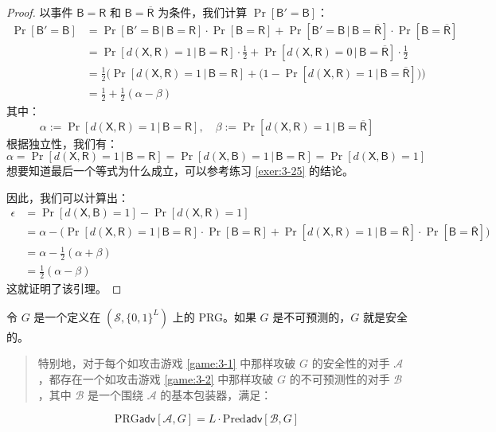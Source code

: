 \begin{proof}
以事件 $\mathsf{B}=\mathsf{R}$ 和 $\mathsf{B}=\mathsf{\overline R}$ 为条件，我们计算 $\Pr[\mathsf{B}'=\mathsf{B}]$：
\[
\begin{aligned}
\Pr[\mathsf{B}'=\mathsf{B}]
&=\Pr[\mathsf{B}'=\mathsf{B}\,|\,\mathsf{B}=\mathsf{R}]\cdot\Pr[\mathsf{B}=\mathsf{R}]+\Pr[\mathsf{B}'=\mathsf{B}\,|\,\mathsf{B}=\mathsf{\overline R}]\cdot\Pr[\mathsf{B}=\mathsf{\overline R}]\\
&=\Pr[d(\mathsf{X},\mathsf{R})=1\,|\,\mathsf{B}=\mathsf{R}]\cdot\frac{1}{2}+\Pr[d(\mathsf{X},\mathsf{R})=0\,|\,\mathsf{B}=\mathsf{\overline R}]\cdot\frac{1}{2}\\
&=\frac{1}{2}
\Big(\Pr[d(\mathsf{X},\mathsf{R})=1\,|\,\mathsf{B}=\mathsf{R}]+
\big(
1-\Pr[d(\mathsf{X},\mathsf{R})=1\,|\,\mathsf{B}=\mathsf{\overline R}]
\big)
\Big)\\
&=\frac{1}{2}+\frac{1}{2}(\alpha-\beta)
\end{aligned}
\]
其中：
\[
\alpha:=\Pr[d(\mathsf{X},\mathsf{R})=1\,|\,\mathsf{B}=\mathsf{R}],
\quad
\beta:=\Pr[d(\mathsf{X},\mathsf{R})=1\,|\,\mathsf{B}=\mathsf{\overline R}]
\]
根据独立性，我们有：
\[
\alpha=\Pr[d(\mathsf{X},\mathsf{R})=1\,|\,\mathsf{B}=\mathsf{R}]=\Pr[d(\mathsf{X},\mathsf{B})=1\,|\,\mathsf{B}=\mathsf{R}]=\Pr[d(\mathsf{X},\mathsf{B})=1]
\]
想要知道最后一个等式为什么成立，可以参考练习 \ref{exer:3-25} 的结论。

因此，我们可以计算出：
\[
\begin{aligned}
\epsilon
&=\Pr[d(\mathsf{X},\mathsf{B})=1]-\Pr[d(\mathsf{X},\mathsf{R})=1]\\
&=\alpha-
\Big(\Pr[d(\mathsf{X},\mathsf{R})=1\,|\,\mathsf{B}=\mathsf{R}]\cdot\Pr[\mathsf{B}=\mathsf{R}]+\Pr[d(\mathsf{X},\mathsf{R})=1\,|\,\mathsf{B}=\mathsf{\overline R}]\cdot\Pr[\mathsf{B}=\mathsf{\overline R}]
\Big)\\
&=\alpha-\frac{1}{2}(\alpha+\beta)\\
&=\frac{1}{2}(\alpha-\beta)
\end{aligned}
\]
这就证明了该引理。
\end{proof}

\begin{theorem}\label{theo:3-6}
令 $G$ 是一个定义在 $(\mathcal{S},\{0,1\}^L)$ 上的 PRG。如果 $G$ 是不可预测的，$G$ 就是安全的。
\begin{quote}
特别地，对于每个如攻击游戏 \ref{game:3-1} 中那样攻破 $G$ 的安全性的对手 $\mathcal{A}$，都存在一个如攻击游戏 \ref{game:3-2} 中那样攻破 $G$ 的不可预测性的对手 $\mathcal{B}$，其中 $\mathcal{B}$ 是一个围绕 $\mathcal{A}$ 的基本包装器，满足：
\end{quote}
\[
\mathrm{PRG}\mathsf{adv}[\mathcal{A},G]
=L\cdot
\mathrm{Pred}\mathsf{adv}[\mathcal{B},G]
\]
\end{theorem}

